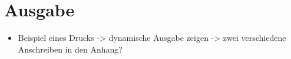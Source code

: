 \section{Ausgabe}

	\begin{itemize}
		\item Beispiel eines Drucks -> dynamische Ausgabe zeigen -> zwei verschiedene Anschreiben in den Anhang?
	\end{itemize}
